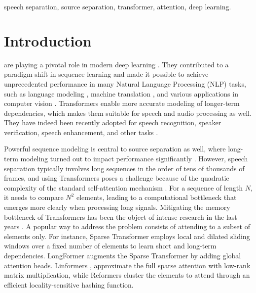 \documentclass[lettersize,journal]{IEEEtran}
\begin{document}
\begin{IEEEkeywords}
speech separation, source separation, transformer, attention, deep learning.
\end{IEEEkeywords}






\IEEEpeerreviewmaketitle

\newcommand{\mixture}{x}
\newcommand{\ldim}{F}
\newcommand{\len}{T}
\newcommand{\llen}{T'}
\newcommand{\nspk}{Ns}
\newcommand{\nsepf}{M}
\newcommand{\chnksize}{C}
\newcommand{\hopsize}{H}
\newcommand{\numchnks}{Nc}
\newcommand{\numintra}{N_\text{intra}}
\newcommand{\numinter}{N_\text{inter}}

\newcommand{\cem}[1]{#1}
\newcommand{\cemAQ}[1]{#1}

\section{Introduction}
 are playing a pivotal role in modern deep learning \cite{vaswani2017}. They contributed to a paradigm shift in sequence learning and made it possible to achieve unprecedented performance in many Natural Language Processing (NLP) tasks, such as language modeling \cite{devlin-etal-2019-bert}, machine translation \cite{liu-etal-2020-multilingual-denoising}, and various applications in computer vision \cite{dosovitskiy2021image, gong2021vision}.
Transformers enable more accurate modeling of longer-term dependencies, which makes them suitable for speech and audio processing as well.
They have indeed been recently adopted for speech recognition, speaker verification, speech enhancement, and other tasks \cite{dong2018speechtransformer, gulati2020conformer}. 

\cem{Powerful sequence modeling is central to source separation as well, where long-term modeling turned out to impact performance significantly \cite{luo2020dualpath, dptn}.
However, speech separation typically involves long sequences in the order of tens of thousands of frames, and using Transformers poses a challenge because of the quadratic complexity of the standard self-attention mechanism \cite{vaswani2017}. 
For a sequence of length $N$, it needs to compare $N^2$ elements, leading to a computational bottleneck that emerges more clearly when processing long signals}. Mitigating the memory bottleneck of Transformers has been the object of intense research in the last years \cite{child2019generatingsparse, beltagy2020longformer, wang2020linformer, kitaev2020reformer}.
A popular way to address the problem consists of attending to a subset of elements only. For instance, Sparse Transformer \cite{child2019generatingsparse} employs local and dilated sliding windows over a fixed number of elements to learn short and long-term dependencies. LongFormer \cite{beltagy2020longformer} augments the Sparse Transformer by adding global attention heads. Linformers \cite{wang2020linformer}, approximate the full sparse attention with low-rank matrix multiplication, while Reformers \cite{kitaev2020reformer} cluster the elements to attend through an efficient locality-sensitive hashing function. 
\end{document}
